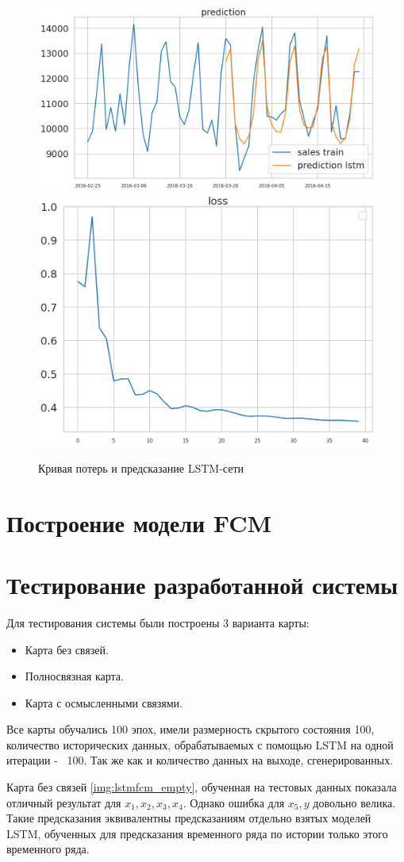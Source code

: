 \def\figurename{Рис}
\begin{figure}[t]
	\centering
	\includegraphics[width=0.4\columnwidth]{./img/lstm_prediction.png}
	\includegraphics[width=0.4\columnwidth]{./img/lstm_loss.png}
	\caption{Кривая потерь и предсказание LSTM-сети}
	\label{img:arimax_forecast}
\end{figure}

\section{Построение модели FCM}



\section{Тестирование разработанной системы}

Для тестирования системы были построены 3 варианта карты:
\begin{itemize}
	\item Карта без связей.
	\item Полносвязная карта.
	\item Карта с осмысленными связями.
\end{itemize}


Все карты обучались 100 эпох, имели размерность скрытого состояния 100,
количество исторических данных, обрабатываемых с помощью LSTM на одной итерации -~ 100.
Так же как и количество данных на выходе, сгенерированных.


Карта без связей \ref{img:lstmfcm_empty}, обученная на тестовых данных
показала отличный результат для $ x_1, x_2, x_3, x_4  $. Однако ошибка
для $ x_5, y $ довольно велика. Такие предсказания эквивалентны предсказаниям
отдельно взятых моделей LSTM, обученных для предсказания временного ряда
по истории только этого временного ряда.

